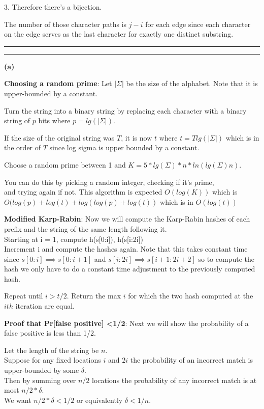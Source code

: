 \documentclass[11pt]{article}
\newcommand{\question}[2] {\vspace{.25in} \hrule\vspace{0.5em}
\noindent{\bf #1: #2} \vspace{0.5em}
\hrule \vspace{.10in}}
\renewcommand{\part}[1] {\vspace{.10in} {\bf (#1)}}
\begin{document}
3. Therefore there's a bijection.

The number of those character paths is $j-i$ for each edge since each character on the edge serves as the last character for exactly one distinct substring.





\question{3}{LDIS}
\part{a}

\textbf{Choosing a random prime}:
Let $|\Sigma|$ be the size of the alphabet. Note that it is upper-bounded by a constant.

Turn the string into a binary string by replacing each character with a binary string of $p$ bits where $p = lg(|\Sigma|)$.

If the size of the original string was $T$, it is now $t$ where $t = T lg(|\Sigma|)$ which is in the order of $T$ since log sigma is upper bounded by a constant.

Choose a random prime between 1 and $K = 5*lg(\Sigma)*n*ln(lg(\Sigma)n)$.

You can do this by picking a random integer, checking if it's prime,\\
and trying again if not. This algorithm is expected $O(log(K))$ which is $O(log(p) + log(t) + log(log(p) + log(t))$ which is in $O(log(t))$

\textbf{Modified Karp-Rabin}:
Now we will compute the Karp-Rabin hashes of each prefix and the string of the same length following it.\\
Starting at i = 1, compute h(s[0:i]), h(s[i:2i])\\
Increment i and compute the hashes again. Note that this takes constant time since $s[0:i] \implies s[0:i+1]$ and $s[i:2i] \implies s[i+1:2i+2]$ so to compute the hash we only have to do a constant time adjustment to the previously computed hash.

Repeat until $i > t/2$. Return the max $i$ for which the two hash computed at the $ith$ iteration are equal.

\textbf{Proof that Pr[false positive] \textless 1/2}:
Next we will show the probability of a false positive is less than 1/2.

Let the length of the string be $n$. \\
Suppose for any fixed locations $i$ and $2i$ the probability of an incorrect match is upper-bounded by some $\delta$.\\
Then by summing over $n/2$ locations the probability of any incorrect match is at most $n/2 * \delta$.\\
We want $n/2 * \delta < 1/2$ or equivalently $\delta < 1/n$.
\end{document}
